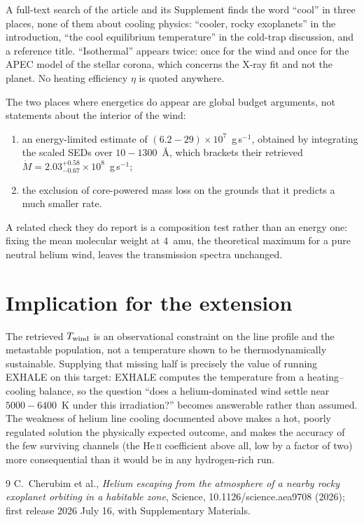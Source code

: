 \documentclass[english,a4paper]{my_memo}
\begin{document}
A full-text search of the article and its Supplement finds the word
``cool'' in three places, none of them about cooling physics: ``cooler,
rocky exoplanets'' in the introduction, ``the cool equilibrium temperature''
in the cold-trap discussion, and a reference title. ``Isothermal'' appears
twice: once for the wind and once for the APEC model of the stellar corona,
which concerns the X-ray fit and not the planet. No heating efficiency
$\eta$ is quoted anywhere.

The two places where energetics do appear are global budget arguments, not
statements about the interior of the wind:

\begin{enumerate}
\item an energy-limited estimate of $(6.2\!-\!29)\times10^{7}$~g\,s$^{-1}$,
      obtained by integrating the scaled SEDs over $10\!-\!1300$~\AA{},
      which brackets their retrieved
      $\dot{M} = 2.03^{+0.58}_{-0.67}\times10^{8}$~g\,s$^{-1}$;
\item the exclusion of core-powered mass loss on the grounds that it
      predicts a much smaller rate.
\end{enumerate}

A related check they do report is a composition test rather than an energy
one: fixing the mean molecular weight at $4$~amu, the theoretical maximum
for a pure neutral helium wind, leaves the transmission spectra unchanged.

\section{Implication for the extension}

The retrieved $T_{\rm wind}$ is an observational constraint on the line
profile and the metastable population, not a temperature shown to be
thermodynamically sustainable. Supplying that missing half is precisely the
value of running EXHALE on this target: EXHALE computes the temperature from
a heating--cooling balance, so the question ``does a helium-dominated wind
settle near $5000\!-\!6400$~K under this irradiation?'' becomes answerable
rather than assumed. The weakness of helium line cooling documented above
makes a hot, poorly regulated solution the physically expected outcome, and
makes the accuracy of the few surviving channels (the He\,\textsc{ii}
coefficient above all, low by a factor of two) more consequential than it
would be in any hydrogen-rich run.

\begin{thebibliography}{9}
C.~Cherubim et al.,
\emph{Helium escaping from the atmosphere of a nearby rocky exoplanet
orbiting in a habitable zone},
Science, 10.1126/science.aea9708 (2026);
first release 2026 July 16, with Supplementary Materials.
\end{thebibliography}
\end{document}
